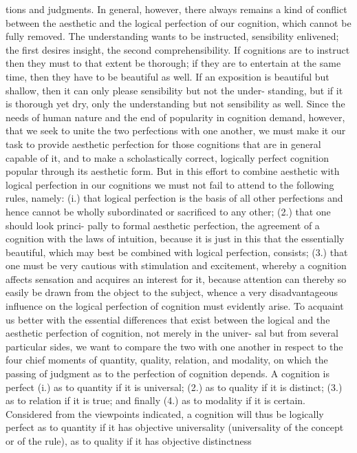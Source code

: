 tions and judgments.
In general, however, there always remains a kind of conflict between the
aesthetic and the logical perfection of our cognition, which cannot be fully
removed. The understanding wants to be instructed, sensibility enlivened;
the first desires insight, the second comprehensibility. If cognitions are to
instruct then they must to that extent be thorough; if they are to entertain
at the same time, then they have to be beautiful as well. If an exposition is
beautiful but shallow, then it can only please sensibility but not the under-
standing, but if it is thorough yet dry, only the understanding but not
sensibility as well.
Since the needs of human nature and the end of popularity in cognition
demand, however, that we seek to unite the two perfections with one
another, we must make it our task to provide aesthetic perfection for those
cognitions that are in general capable of it, and to make a scholastically
correct, logically perfect cognition popular through its aesthetic form. But
in this effort to combine aesthetic with logical perfection in our cognitions
we must not fail to attend to the following rules, namely: (i.) that logical
perfection is the basis of all other perfections and hence cannot be wholly
subordinated or sacrificed to any other; (2.) that one should look princi-
pally to formal aesthetic perfection, the agreement of a cognition with the
laws of intuition, because it is just in this that the essentially beautiful,
which may best be combined with logical perfection, consists; (3.) that one
must be very cautious with stimulation and excitement, whereby a cognition
affects sensation and acquires an interest for it, because attention can
thereby so easily be drawn from the object to the subject, whence a very
disadvantageous influence on the logical perfection of cognition must
evidently arise.
To acquaint us better with the essential differences that exist between the
logical and the aesthetic perfection of cognition, not merely in the univer-
sal but from several particular sides, we want to compare the two with one
another in respect to the four chief moments of quantity, quality, relation,
and modality, on which the passing of judgment as to the perfection of
cognition depends.
A cognition is perfect (i.) as to quantity if it is universal; (2.) as to quality
if it is distinct; (3.) as to relation if it is true; and finally (4.) as to modality if
it is certain.
Considered from the viewpoints indicated, a cognition will thus be
logically perfect as to quantity if it has objective universality (universality
of the concept or of the rule), as to quality if it has objective distinctness
